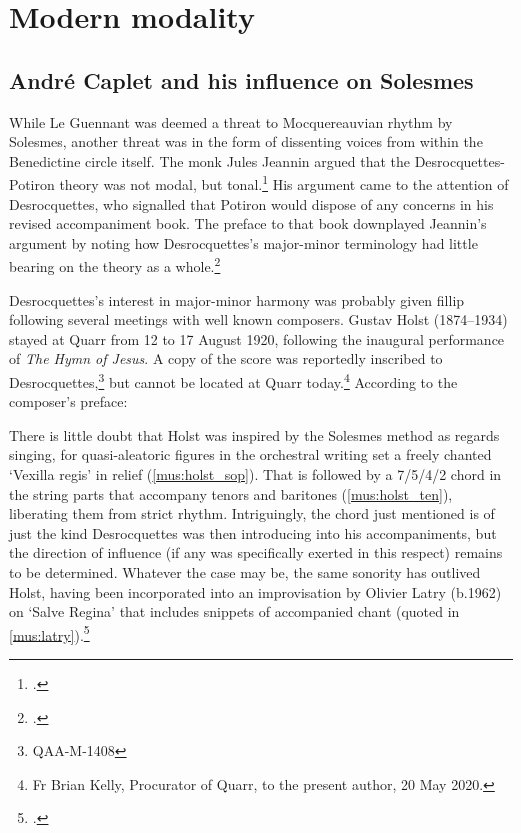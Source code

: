 \section{Modern modality}
\subsection{André Caplet and his influence on Solesmes}
While Le Guennant was deemed a threat to Mocquereauvian rhythm by Solesmes, another threat was in the form of dissenting voices from within the Benedictine circle itself.
The monk Jules Jeannin argued that the Desrocquettes-Potiron theory was not modal, but tonal.\footcite[11--12]{Jeanninimportancetiercedans1926}
His argument came to the attention of Desrocquettes, who signalled that Potiron would dispose of any concerns in his revised accompaniment book.
The preface to that book downplayed Jeannin's argument by noting how Desrocquettes's major-minor terminology had little bearing on the theory as a whole.\footcite[pp.~xi, xii n.~1]{PotironTreatiseAccompanimentGregorian1933}

Desrocquettes's interest in major-minor harmony was probably given fillip following several meetings with well known composers.
Gustav Holst (1874--1934) stayed at Quarr from 12 to 17 August 1920, following the inaugural performance of \emph{The Hymn of Jesus}.
A copy of the score was reportedly inscribed to Desrocquettes,\footnote{\qaa{} QAA-M-1408} but cannot be located at Quarr today.\footnote{Fr Brian Kelly, Procurator of Quarr, to the present author, 20 May 2020.}
According to the composer's preface:

  {\cite[pp.~3, 8--9]{HolstHymnJesus1919}}
\noindent
There is little doubt that Holst was inspired by the Solesmes method as regards singing, for quasi-aleatoric figures in the orchestral writing set a freely chanted `Vexilla regis' in relief (\cref{mus:holst_sop}).
That is followed by a 7/5/4/2 chord in the string parts that accompany tenors and baritones (\cref{mus:holst_ten}), liberating them from strict rhythm.
Intriguingly, the chord just mentioned is of just the kind Desrocquettes was then introducing into his accompaniments, but the direction of influence (if any was specifically exerted in this respect) remains to be determined.
Whatever the case may be, the same sonority has outlived Holst, having been incorporated into an improvisation by Olivier Latry (b.1962) on `Salve Regina' that includes snippets of accompanied chant (quoted in \cref{mus:latry}).\footcite[27]{LatrySalveReginapour2010}

